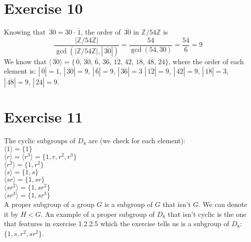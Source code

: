 \documentclass[12pt]{article}
\newcommand{\Z}{\mathbb{Z}}
\newcommand{\olsi}[1]{\,\overline{\!{#1}}}
\begin{document}
    \section*{Exercise 10}
    Knowing that $\olsi{30} = 30 \cdot \olsi{1}$,
    the order of $\olsi{30}$ in $\Z/54\Z$ is
    \[ \dfrac{|\Z/54\Z|}{\gcd(|\Z/54\Z|, |\olsi{30}|)}
    = \dfrac{54}{\gcd(54, 30)} 
    = \dfrac{54}{6}
    = 9 \]
    We know that $\langle \olsi{30} \rangle
    = \{ \olsi{0}, \olsi{30}, \olsi{6}, \olsi{36}, \olsi{12}, 
    \olsi{42}, \olsi{18}, \olsi{48}, \olsi{24}\}$,
    where the order of each element is: $|\olsi{0}| = 1$,
    $|\olsi{30}| = 9$, $|\olsi{6}| = 9$, $|\olsi{36}| = 3$
    $|\olsi{12}| = 9$, $|\olsi{42}| = 9$, $|\olsi{18}| = 3$,
    $|\olsi{48}| = 9$, $|\olsi{24}| = 9$.


    \section*{Exercise 11}
    The cyclic subgroups of $D_8$ are (we check for each element): \\
    $\langle 1 \rangle = \{1\}$ \\
    $\langle r \rangle = \langle r^3 \rangle = \{1, r, r^2, r^3\}$ \\
    $\langle r^2 \rangle = \{1, r^2\}$ \\
    $\langle s \rangle = \{1, s\}$ \\
    $\langle sr \rangle = \{1, sr\}$ \\
    $\langle sr^2 \rangle = \{1, sr^2\}$ \\
    $\langle sr^3 \rangle = \{1, sr^3\}$ \\
    A proper subgroup of a group $G$ is a subgroup of $G$ that isn't $G$.
    We can denote it by $H < G$.
    An example of a proper subgroup of $D_8$
    that isn't cyclic is the one that features in exercise 1.2.2.5
    which the exercise tells us is a subgroup of $D_8$:
    $\{1, s, r^2, sr^2\}$.
\end{document}
